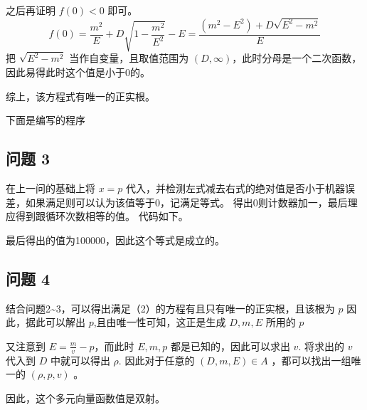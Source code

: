 \documentclass[12pt]{ctexart}
\begin{document}
之后再证明 $f(0)<0$ 即可。
\[f(0)=\frac{m^2}{E}+D\sqrt {1-\frac{m^2}{E^2}}-E=\frac{(m^2-E^2)+D\sqrt {E^2-m^2}}{E}\]
把 \(\sqrt {E^2-m^2}\) 当作自变量，且取值范围为 $(D,\infty)$，此时分母是一个二次函数，因此易得此时这个值是小于0的。

综上，该方程式有唯一的正实根。

下面是编写的程序



\subsection{问题 3}
在上一问的基础上将 $x=p$ 代入，并检测左式减去右式的绝对值是否小于机器误差，如果满足则可以认为该值等于0，记满足等式。
得出0则计数器加一，最后理应得到跟循环次数相等的值。
代码如下。

最后得出的值为100000，因此这个等式是成立的。

\subsection{问题 4}
结合问题2\textasciitilde3，可以得出满足（2）的方程有且只有唯一的正实根，且该根为 $p$
因此，据此可以解出 $p$,且由唯一性可知，这正是生成 $D,m,E$ 所用的 $p$

又注意到 $E=\frac{m}{v}-p$，而此时 $E,m,p$ 都是已知的，因此可以求出 $v$.
将求出的 $v$ 代入到 $D$ 中就可以得出 $\rho$.
因此对于任意的 $(D, m, E) \in A$ ，都可以找出一组唯一的 $(\rho,p,v)$ 。

因此，这个多元向量函数值是双射。
\end{document}
